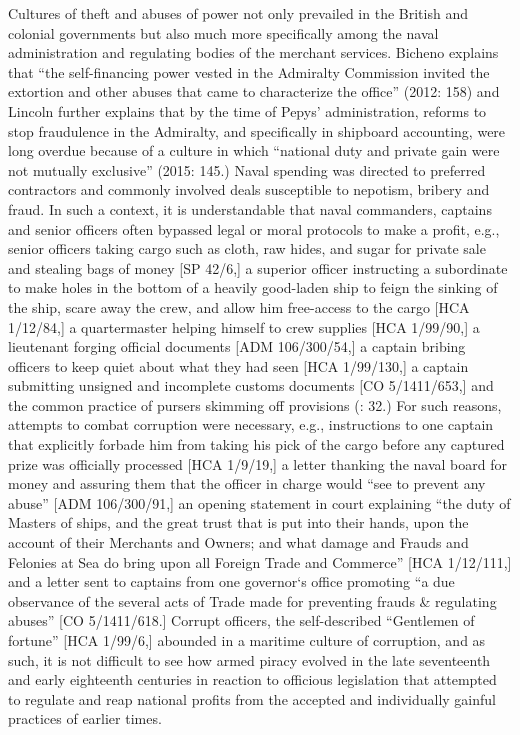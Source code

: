 Cultures of theft and abuses of power not only prevailed in the British and colonial governments but also much more specifically among the naval administration and regulating bodies of the merchant services. Bicheno explains that “the self-financing power vested in the Admiralty Commission invited the extortion and other abuses that came to characterize the office” (2012: 158) and Lincoln further explains that by the time of Pepys’ administration, reforms to stop fraudulence in the Admiralty, and specifically in shipboard accounting, were long overdue because of a culture in which “national duty and private gain were not mutually exclusive” (2015: 145.) Naval spending was directed to preferred contractors and commonly involved deals susceptible to nepotism, bribery and fraud. In such a context, it is understandable that naval commanders, captains and senior officers often bypassed legal or moral protocols to make a profit, e.g., senior officers taking cargo such as cloth, raw hides, and sugar for private sale and stealing bags of money [SP 42/6,] a superior officer instructing a subordinate to make holes in the bottom of a heavily good-laden ship to feign the sinking of the ship, scare away the crew, and allow him free-access to the cargo [HCA 1/12/84,] a quartermaster helping himself to crew supplies [HCA 1/99/90,] a lieutenant forging official documents [ADM 106/300/54,] a captain bribing officers to keep quiet about what they had seen [HCA 1/99/130,] a captain submitting unsigned and incomplete customs documents [CO 5/1411/653,] and the common practice of pursers skimming off provisions (\citealt{AdkinsAdkins2008}: 32.)  For such reasons, attempts to combat corruption were necessary, e.g., instructions to one captain that explicitly forbade him from taking his pick of the cargo before any captured prize was officially processed [HCA 1/9/19,] a letter thanking the naval board for money and assuring them that the officer in charge would “see to prevent any abuse” [ADM 106/300/91,] an opening statement in court explaining “the duty of Masters of ships, and the great trust that is put into their hands, upon the account of their Merchants and Owners; and what damage and Frauds and Felonies at Sea do bring upon all Foreign Trade and Commerce” [HCA 1/12/111,] and a letter sent to captains from one governor‘s office promoting “a due observance of the several acts of Trade made for preventing frauds \& regulating abuses” [CO 5/1411/618.] Corrupt officers, the self-described “Gentlemen of fortune” [HCA 1/99/6,] abounded in a maritime culture of corruption, and as such, it is not difficult to see how armed piracy evolved in the late seventeenth and early eighteenth centuries in reaction to officious legislation that attempted to regulate and reap national profits from the accepted and individually gainful practices of earlier times. 


